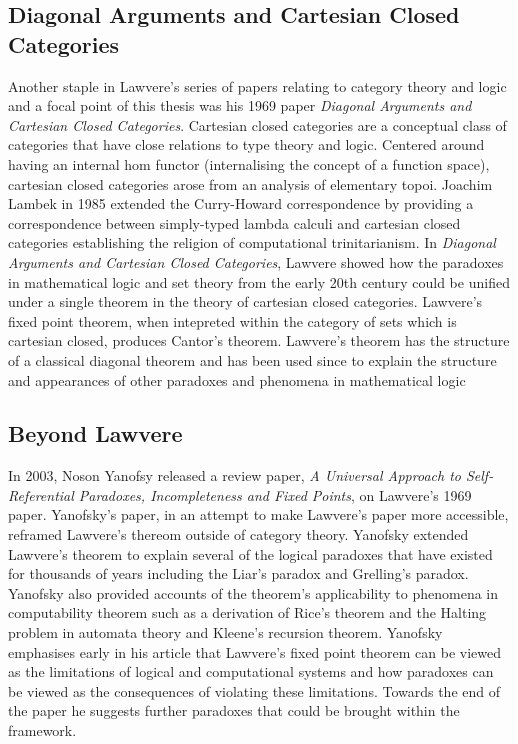 \subsection{Diagonal Arguments and Cartesian Closed Categories}
Another staple in Lawvere's series of papers relating to category theory and
logic and a focal point of this thesis was his 1969 paper \textit{Diagonal
Arguments and Cartesian Closed Categories}. Cartesian closed categories are
a conceptual class of categories that have close relations to type theory and
logic. Centered around having an internal hom functor (internalising the concept
of a function space), cartesian closed categories arose from an analysis of
elementary topoi. Joachim Lambek in 1985 extended the Curry-Howard
correspondence by providing a correspondence between simply-typed lambda calculi
and cartesian closed categories establishing the religion of computational
trinitarianism. In \textit{Diagonal Arguments and Cartesian Closed Categories},
Lawvere showed how the paradoxes in mathematical logic and set theory from the
early 20th century could be unified under a single theorem in the theory of
cartesian closed categories. Lawvere's fixed point theorem, when intepreted
within the category of sets which is cartesian closed, produces Cantor's
theorem. Lawvere's theorem has the structure of a classical diagonal theorem and
has been used since to explain the structure and appearances of other paradoxes
and phenomena in mathematical logic


\subsection{Beyond Lawvere}

In 2003, Noson Yanofsy released a review paper, \textit{A Universal Approach to
Self-Referential Paradoxes, Incompleteness and Fixed Points}, on Lawvere's 1969
paper.  Yanofsky's paper, in an attempt to make Lawvere's paper more accessible,
reframed Lawvere's thereom outside of category theory. Yanofsky extended
Lawvere's theorem to explain several of the logical paradoxes that have existed
for thousands of years including the Liar's paradox and Grelling's paradox.
Yanofsky also provided accounts of the theorem's applicability to phenomena in
computability theorem such as a derivation of Rice's theorem  and the Halting
problem in automata theory and Kleene's recursion theorem. Yanofsky emphasises
early in his article that Lawvere's fixed point theorem can be viewed as the
limitations of logical and computational systems and how paradoxes can be viewed
as the consequences of violating these limitations. Towards the end of the paper
he suggests further paradoxes that could be brought within the framework.


